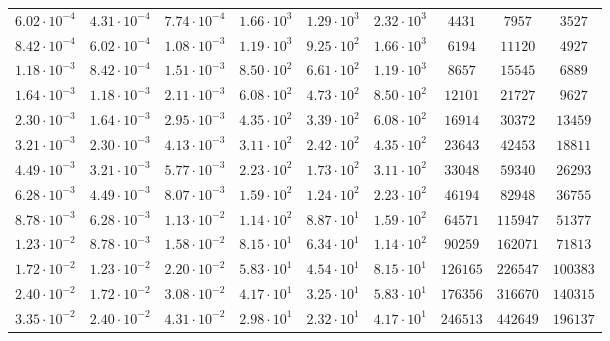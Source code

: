 \documentclass[draft,linenumbers]{agujournal2018}
\begin{document}
\begin{table}
\begin{tabular}{c c c c c c c c c}
$6.02\cdot 10^{-4}$ & $4.31\cdot 10^{-4}$ & $7.74\cdot 10^{-4}$ & $1.66\cdot 10^{3}$ & $1.29\cdot 10^{3}$ & $2.32\cdot 10^{3}$ & $      4431$ & $      7957$ & $   3527$\\
$8.42\cdot 10^{-4}$ & $6.02\cdot 10^{-4}$ & $1.08\cdot 10^{-3}$ & $1.19\cdot 10^{3}$ & $9.25\cdot 10^{2}$ & $1.66\cdot 10^{3}$ & $      6194$ & $     11120$ & $   4927$\\
$1.18\cdot 10^{-3}$ & $8.42\cdot 10^{-4}$ & $1.51\cdot 10^{-3}$ & $8.50\cdot 10^{2}$ & $6.61\cdot 10^{2}$ & $1.19\cdot 10^{3}$ & $      8657$ & $     15545$ & $   6889$\\
$1.64\cdot 10^{-3}$ & $1.18\cdot 10^{-3}$ & $2.11\cdot 10^{-3}$ & $6.08\cdot 10^{2}$ & $4.73\cdot 10^{2}$ & $8.50\cdot 10^{2}$ & $     12101$ & $     21727$ & $   9627$\\
$2.30\cdot 10^{-3}$ & $1.64\cdot 10^{-3}$ & $2.95\cdot 10^{-3}$ & $4.35\cdot 10^{2}$ & $3.39\cdot 10^{2}$ & $6.08\cdot 10^{2}$ & $     16914$ & $     30372$ & $  13459$\\
$3.21\cdot 10^{-3}$ & $2.30\cdot 10^{-3}$ & $4.13\cdot 10^{-3}$ & $3.11\cdot 10^{2}$ & $2.42\cdot 10^{2}$ & $4.35\cdot 10^{2}$ & $     23643$ & $     42453$ & $  18811$\\
$4.49\cdot 10^{-3}$ & $3.21\cdot 10^{-3}$ & $5.77\cdot 10^{-3}$ & $2.23\cdot 10^{2}$ & $1.73\cdot 10^{2}$ & $3.11\cdot 10^{2}$ & $     33048$ & $     59340$ & $  26293$\\
$6.28\cdot 10^{-3}$ & $4.49\cdot 10^{-3}$ & $8.07\cdot 10^{-3}$ & $1.59\cdot 10^{2}$ & $1.24\cdot 10^{2}$ & $2.23\cdot 10^{2}$ & $     46194$ & $     82948$ & $  36755$\\
$8.78\cdot 10^{-3}$ & $6.28\cdot 10^{-3}$ & $1.13\cdot 10^{-2}$ & $1.14\cdot 10^{2}$ & $8.87\cdot 10^{1}$ & $1.59\cdot 10^{2}$ & $     64571$ & $    115947$ & $  51377$\\
$1.23\cdot 10^{-2}$ & $8.78\cdot 10^{-3}$ & $1.58\cdot 10^{-2}$ & $8.15\cdot 10^{1}$ & $6.34\cdot 10^{1}$ & $1.14\cdot 10^{2}$ & $     90259$ & $    162071$ & $  71813$\\
$1.72\cdot 10^{-2}$ & $1.23\cdot 10^{-2}$ & $2.20\cdot 10^{-2}$ & $5.83\cdot 10^{1}$ & $4.54\cdot 10^{1}$ & $8.15\cdot 10^{1}$ & $    126165$ & $    226547$ & $ 100383$\\
$2.40\cdot 10^{-2}$ & $1.72\cdot 10^{-2}$ & $3.08\cdot 10^{-2}$ & $4.17\cdot 10^{1}$ & $3.25\cdot 10^{1}$ & $5.83\cdot 10^{1}$ & $    176356$ & $    316670$ & $ 140315$\\
$3.35\cdot 10^{-2}$ & $2.40\cdot 10^{-2}$ & $4.31\cdot 10^{-2}$ & $2.98\cdot 10^{1}$ & $2.32\cdot 10^{1}$ & $4.17\cdot 10^{1}$ & $    246513$ & $    442649$ & $ 196137$\\

\end{tabular}
\end{table}
\end{document}
